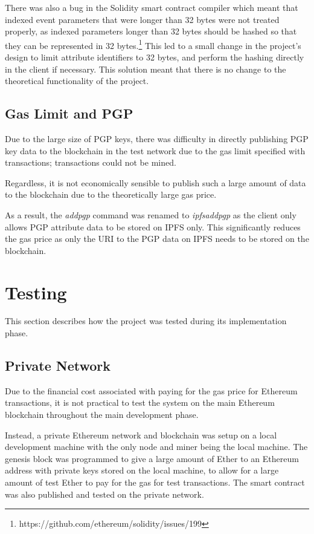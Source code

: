 \documentclass[12pt]{report}
\begin{document}
	There was also a bug in the Solidity smart contract compiler which meant that indexed event parameters that were longer than 32 bytes were not treated properly, as indexed parameters longer than 32 bytes should be hashed so that they can be represented in 32 bytes.\footnote{https://github.com/ethereum/solidity/issues/199} This led to a small change in the project's design to limit attribute identifiers to 32 bytes, and perform the hashing directly in the client if necessary. This solution meant that there is no change to the theoretical functionality of the project.
	
	\subsection{Gas Limit and PGP}
	Due to the large size of PGP keys, there was difficulty in directly publishing PGP key data to the blockchain in the test network due to the gas limit specified with transactions; transactions could not be mined.
	
	Regardless, it is not economically sensible to publish such a large amount of data to the blockchain due to the theoretically large gas price.
	
	As a result, the \textit{addpgp} command was renamed to \textit{ipfsaddpgp} as the client only allows PGP attribute data to be stored on IPFS only. This significantly reduces the gas price as only the URI to the PGP data on IPFS needs to be stored on the blockchain.
	
	\section{Testing}
	This section	 describes how the project was tested during its implementation phase.
	
	\subsection{Private Network}
	Due to the financial cost associated with paying for the gas price for Ethereum transactions, it is not practical to test the system on the main Ethereum blockchain throughout the main development phase.
	
	Instead, a private Ethereum network and blockchain was setup on a local development machine with the only node and miner being the local machine. The genesis block was programmed to give a large amount of Ether to an Ethereum address with private keys stored on the local machine, to allow for a large amount of test Ether to pay for the gas for test transactions. The smart contract was also published and tested on the private network.
	
\end{document}
